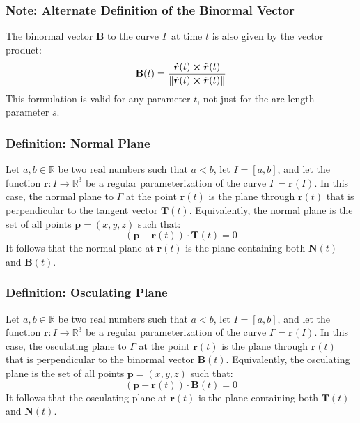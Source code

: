 \documentclass[11pt, a4paper]{article}
\begin{document}
\subsubsection{Note: Alternate Definition of the Binormal Vector}
The binormal vector $ \mathbf{B} $ to the curve $ \Gamma $ at time $ t $ is also given by the vector product:
\begin{equation*}
	\mathbf{B}(t) = \frac{\dot{\bm{r}}(t)  \cross \ddot{\bm{r}}(t) }{\norm{\dot{\bm{r}}(t)  \cross \ddot{\bm{r}}(t) }}
\end{equation*}
This formulation is valid for any parameter $ t $, not just for the arc length parameter $ s $.

\subsubsection{Definition: Normal Plane}
	Let $ a, b \in \mathbb{R} $ be two real numbers such that $ a < b $, let $ I = [a, b] $, and let the function $ \bm{r} : I \rightarrow \mathbb{R}^3 $ be a regular parameterization of the curve $ \Gamma = \bm{r}(I) $. In this case, the normal plane to $ \Gamma $ at the point $ \bm{r}(t) $ is the plane through $ \bm{r}(t) $ that is perpendicular to the tangent vector $ \mathbf{T}(t) $. Equivalently, the normal plane is the set of all points $ \bm{p} = (x, y, z) $ such that:
\begin{equation*}
	\left(\bm{p} - \bm{r}(t)\right) \cdot \mathbf{T}(t) = 0
\end{equation*}
It follows that the normal plane at $ \bm{r}(t) $ is the plane containing both $ \mathbf{N}(t) $ and $ \mathbf{B}(t) $. 

\subsubsection{Definition: Osculating Plane}
Let $ a, b \in \mathbb{R} $ be two real numbers such that $ a < b $, let $ I = [a, b] $, and let the function $ \bm{r} : I \rightarrow \mathbb{R}^3 $ be a regular parameterization of the curve $ \Gamma = \bm{r}(I) $. In this case, the osculating plane to $ \Gamma $ at the point $ \bm{r}(t) $ is the plane through $ \bm{r}(t) $ that is perpendicular to the binormal vector $ \mathbf{B}(t) $. Equivalently, the osculating plane is the set of all points $ \bm{p} = (x, y, z) $ such that:
\begin{equation*}
	\left(\bm{p} - \bm{r}(t)\right) \cdot \mathbf{B}(t) = 0
\end{equation*}
It follows that the osculating plane at $ \bm{r}(t) $ is the plane containing both $ \mathbf{T}(t) $ and $ \mathbf{N}(t) $.
\end{document}
